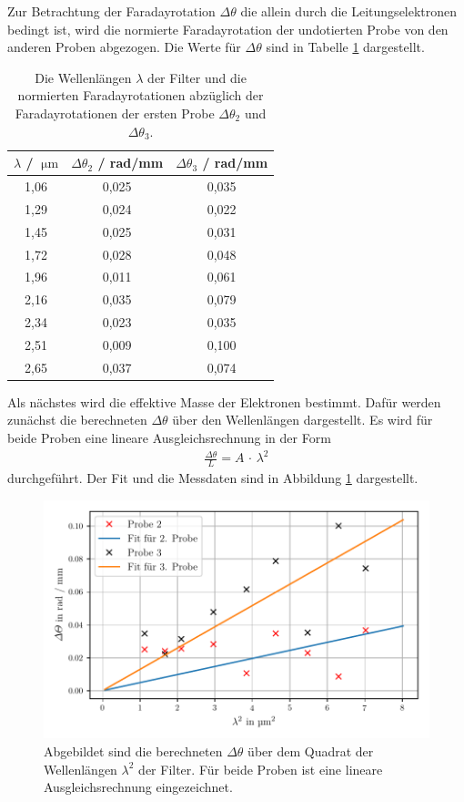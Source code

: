 Zur Betrachtung der Faradayrotation $\Delta\theta$ die allein durch die Leitungselektronen bedingt ist, wird die normierte Faradayrotation der undotierten Probe von den anderen Proben abgezogen.
Die Werte für $\Delta\theta$ sind in Tabelle \ref{tab:deltatheta} dargestellt.

\begin{table}
  \centering
  \begin{tabular}{c c c}
    \toprule
    $\lambda$ / $\SI{}{\micro\metre}$ & $\Delta\theta_2$ / rad/mm & $\Delta\theta_3$ / rad/mm\\
    \midrule
        1,06  & 0,025 & 0,035\\  
        1,29  & 0,024 & 0,022\\  
        1,45  & 0,025 & 0,031\\  
        1,72  & 0,028 & 0,048\\  
        1,96  & 0,011 & 0,061\\  
        2,16  & 0,035 & 0,079\\  
        2,34  & 0,023 & 0,035\\  
        2,51  & 0,009 & 0,100\\  
        2,65  & 0,037 & 0,074\\  
    \bottomrule
  \end{tabular}
  \caption{Die Wellenlängen $\lambda$ der Filter und die
  normierten Faradayrotationen abzüglich der Faradayrotationen der ersten Probe $\Delta\theta_2$ und $\Delta\theta_3$.}
  \label{tab:deltatheta}
\end{table}

Als nächstes wird die effektive Masse der Elektronen bestimmt. Dafür werden zunächst die berechneten $\Delta\theta$ über den Wellenlängen dargestellt. Es wird für beide Proben eine lineare Ausgleichsrechnung in der Form
\begin{align}
  \frac{\Delta\theta}{L} = A\,\cdot\,\lambda^2
\end{align}
durchgeführt. Der Fit und die Messdaten sind in Abbildung \ref{fig:plot23} dargestellt.

\begin{figure}
  \centering
  \includegraphics{build/probe23.pdf}
  \caption{Abgebildet sind die berechneten $\Delta\theta$ über dem Quadrat der Wellenlängen $\lambda^2$ der Filter. Für beide Proben ist eine lineare Ausgleichsrechnung eingezeichnet.}
  \label{fig:plot23}
\end{figure}

